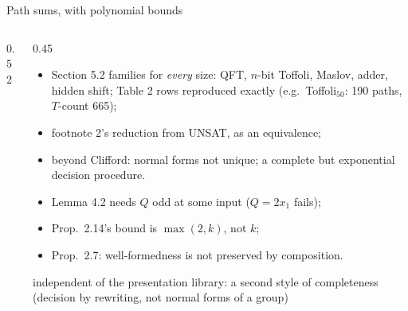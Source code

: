 \begin{frame}{Path sums, with polynomial bounds \New}
\begin{columns}[c]
\begin{column}{0.52\textwidth}
\begin{code}
\\
%
\>[4]%
\>[15]\AgdaSymbol{:}\AgdaSpace{}%
\AgdaSpace{}%
\AgdaSymbol{(}\AgdaSpace{}%
\AgdaSymbol{)}\AgdaSpace{}%
\AgdaSpace{}%
\AgdaSpace{}%
\AgdaSymbol{(}\AgdaSpace{}%
\AgdaOperator{\AgdaPrimitive{*}}\AgdaSpace{}%
\AgdaSpace{}%
\AgdaSymbol{)}\<%
\\
\>[0]\AgdaSpace{}%
\AgdaSymbol{:}\AgdaSpace{}%
\AgdaSpace{}%
\AgdaSpace{}%
\AgdaSpace{}%
\AgdaSpace{}%
\AgdaSpace{}%
\AgdaSpace{}%
\AgdaSpace{}%
\AgdaSpace{}%
\AgdaSpace{}%
\AgdaOperator{\AgdaPrimitive{*}}\AgdaSpace{}%
\AgdaSymbol{(}\AgdaSpace{}%
\AgdaOperator{\AgdaPrimitive{+}}\AgdaSpace{}%
\AgdaSymbol{(}\AgdaSpace{}%
\AgdaOperator{\AgdaPrimitive{+}}\AgdaSpace{}%
\AgdaSymbol{))}\AgdaSpace{}%
\AgdaOperator{\AgdaFunction{\textasciicircum{}}}\AgdaSpace{}%
\<%
\end{code}
\begin{code}[hide]%
\>[0]\AgdaSpace{}%
\AgdaSymbol{=}\AgdaSpace{}%
\<%
\end{code}
\end{column}
\begin{column}{0.45\textwidth}
\footnotesize
\begin{itemize}
  \setlength{\itemsep}{2pt}
  \item Section 5.2 families for \emph{every} size: QFT, $n$-bit Toffoli, Maslov,
        adder, hidden shift; Table 2 rows reproduced exactly (e.g.\ Toffoli$_{50}$:
        190 paths, $T$-count 665);
  \item footnote 2's reduction from UNSAT, as an equivalence;
  \item beyond Clifford: normal forms \alert{not unique}; a complete but
        exponential decision procedure.
\end{itemize}
\begin{keybox}[title={Errata in the paper, each with a checked counterexample}]
\footnotesize
\begin{itemize}
  \item Lemma 4.2 needs $Q$ odd at some input ($Q=2x_1$ fails);
  \item Prop.\ 2.14's bound is $\max(2,k)$, not $k$;
  \item Prop.\ 2.7: well-formedness is not preserved by composition.
\end{itemize}
\end{keybox}
{\scriptsize independent of the presentation library: a second style of completeness
(decision by rewriting, not normal forms of a group)}
\end{column}
\end{columns}
\end{frame}

